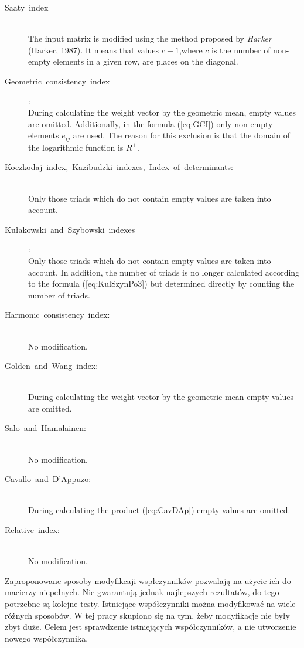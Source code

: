 \begin{description}

\item[Saaty index] \hfill \\ 
	The input matrix is modified using the method proposed by \textit{Harker} (Harker, 1987). It means that values $c+1$,where $c$ is the number of non-empty elements in a given row, are places on the diagonal.

\item[Geometric consistency index]: \hfill \\
	During calculating the weight vector by the geometric mean, empty values are omitted. Additionally, in the formula ([eq:GCI]) only non-empty elements $e_{ij}$ are used. The reason for this exclusion is that the domain of the logarithmic function is $R^{+}$.

\item[Koczkodaj index, Kazibudzki indexes, Index of determinants:] \hfill \\ 
  Only those triads which do not contain empty values are taken into account.

\item[Kułakowski and Szybowski indexes]: \hfill \\ 
	Only those triads which do not contain empty values are taken into account. In addition, the number of triads is no longer calculated according to the formula ([eq:KulSzynPo3]) but determined directly by counting the number of triads.

\item[Harmonic consistency index:] \hfill \\ 
  No modification.

\item[Golden and Wang index:] \hfill \\ 
  During calculating the weight vector by the geometric mean empty values are omitted.

\item[Salo and Hamalainen:] \hfill \\ 
  No modification.

\item[Cavallo and D'Appuzo:] \hfill \\
	During calculating the product ([eq:CavDAp]) empty values are omitted.

\item[Relative index:] \hfill \\ 
  No modification.
\end{description}

Zaproponowane sposoby modyfikcaji wspłczynników pozwalają na użycie ich do macierzy niepełnych. Nie gwarantują jednak najlepszych rezultatów, do tego potrzebne są kolejne testy. Istniejące współczynniki można modyfikować na wiele różnych sposobów. W tej pracy skupiono się na tym, żeby modyfikacje nie były zbyt duże. Celem jest sprawdzenie istniejących współczynników, a nie utworzenie nowego współczynnika. 